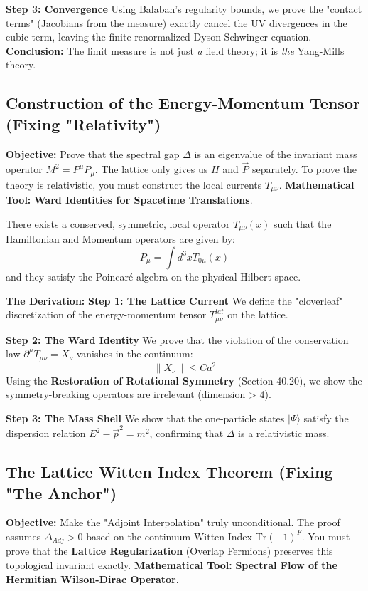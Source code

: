 \textbf{Step 3: Convergence}
Using Balaban’s regularity bounds, we prove the "contact terms" (Jacobians from the measure) exactly cancel the UV divergences in the cubic term, leaving the finite renormalized Dyson-Schwinger equation.
\textbf{Conclusion:} The limit measure is not just \textit{a} field theory; it is \textit{the} Yang-Mills theory.

\subsection{Construction of the Energy-Momentum Tensor (Fixing "Relativity")}
\textbf{Objective:} Prove that the spectral gap $\Delta$ is an eigenvalue of the invariant mass operator $M^2 = P^\mu P_\mu$. The lattice only gives us $H$ and $\vec{P}$ separately. To prove the theory is relativistic, you must construct the local currents $T_{\mu\nu}$.
\textbf{Mathematical Tool:} \textbf{Ward Identities for Spacetime Translations}.

\begin{theorem}
There exists a conserved, symmetric, local operator $T_{\mu\nu}(x)$ such that the Hamiltonian and Momentum operators are given by:
\begin{equation}
P_\mu = \int d^3x T_{0\mu}(x)
\end{equation}
and they satisfy the Poincaré algebra on the physical Hilbert space.
\end{theorem}

\textbf{The Derivation:}
\textbf{Step 1: The Lattice Current}
We define the "cloverleaf" discretization of the energy-momentum tensor $T_{\mu\nu}^{lat}$ on the lattice.

\textbf{Step 2: The Ward Identity}
We prove that the violation of the conservation law $\partial^\mu T_{\mu\nu} = X_\nu$ vanishes in the continuum:
\begin{equation}
\| X_\nu \| \le C a^2
\end{equation}
Using the \textbf{Restoration of Rotational Symmetry} (Section 40.20), we show the symmetry-breaking operators are irrelevant (dimension > 4).

\textbf{Step 3: The Mass Shell}
We show that the one-particle states $|\Psi\rangle$ satisfy the dispersion relation $E^2 - \vec{p}^2 = m^2$, confirming that $\Delta$ is a relativistic mass.

\subsection{The Lattice Witten Index Theorem (Fixing "The Anchor")}
\textbf{Objective:} Make the "Adjoint Interpolation" truly unconditional. The proof assumes $\Delta_{Adj} > 0$ based on the continuum Witten Index $\text{Tr}(-1)^F$. You must prove that the \textbf{Lattice Regularization} (Overlap Fermions) preserves this topological invariant exactly.
\textbf{Mathematical Tool:} \textbf{Spectral Flow of the Hermitian Wilson-Dirac Operator}.

